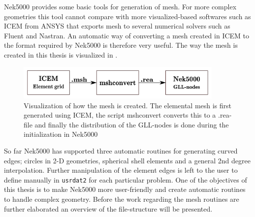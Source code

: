 
Nek5000 provides some basic tools for generation of mesh. For more complex geometries this tool cannot compare with more visualized-based softwares 
such as ICEM from ANSYS that exports mesh to several numerical solvers such as Fluent and Nastran.
An automatic way of converting a mesh created in ICEM to the format required by Nek5000 is therefore very useful. 
The way the mesh is created in this thesis is visualized in .
%
\begin{figure}[h]
	\centering
	\includegraphics[width=0.9\textwidth]{Figures/mesh2.pdf}
	\caption{Visualization of how the mesh is created. The elemental mesh is first generated using ICEM, the script mshconvert
    converts this to a .rea-file and finally the distribution of the GLL-nodes is done during the initialization in Nek5000}
	\label{fig:mesh}
\end{figure}
%

So far Nek5000 has supported three automatic routines for generating curved edges;
circles in 2-D geometries, spherical shell elements and a general 2nd degree interpolation.
Further manipulation of the element edges is left to the user to define manually in \verb|usrdat2|
for each particular problem. One of the objectives of this thesis is to make Nek5000 more
user-friendly and create automatic routines to handle complex geometry. Before the work regarding
the mesh routines are further elaborated an overview of the file-structure will be presented.

